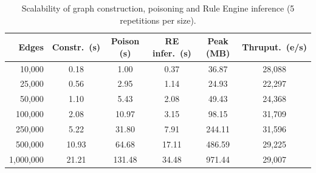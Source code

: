 \begin{table}[t]
\centering
\small
\caption{Scalability of graph construction, poisoning and Rule Engine inference (5 repetitions per size).}
\label{tab:scalability}
\begin{tabular}{rccccc}
\toprule
Edges & Constr.\ (s) & Poison (s) & RE infer.\ (s) & Peak (MB) & Thruput.\ (e/s) \\
\midrule
10,000 & 0.18 & 1.00 & 0.37 & 36.87 & 28,088 \\
25,000 & 0.56 & 2.95 & 1.14 & 24.93 & 22,297 \\
50,000 & 1.10 & 5.43 & 2.08 & 49.43 & 24,368 \\
100,000 & 2.08 & 10.97 & 3.15 & 98.15 & 31,709 \\
250,000 & 5.22 & 31.80 & 7.91 & 244.11 & 31,596 \\
500,000 & 10.93 & 64.68 & 17.11 & 486.59 & 29,225 \\
1,000,000 & 21.21 & 131.48 & 34.48 & 971.44 & 29,007 \\
\bottomrule
\end{tabular}
\end{table}

